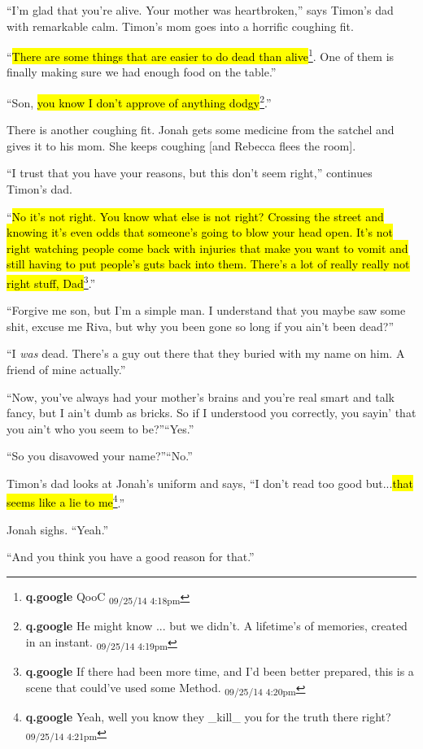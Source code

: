 ``I'm glad that you're alive.  Your mother was heartbroken,'' says Timon's dad with remarkable calm.  Timon's mom goes into a horrific coughing fit.

``\hl{There are some things that are easier to do dead than alive}\footnote{\textbf{q.google }QooC \textsubscript{09/25/14 4:18pm}}.  One of them is finally making sure we had enough food on the table.''

``Son, \hl{you know I don't approve of anything dodgy}\footnote{\textbf{q.google }He might know ... but we didn't.  A lifetime's of memories, created in an instant. \textsubscript{09/25/14 4:19pm}}.''

There is another coughing fit.  Jonah gets some medicine from the satchel and gives it to his mom.  She keeps coughing {[}and Rebecca flees the room{]}.

``I trust that you have your reasons, but this don't seem right,'' continues Timon's dad.

``\hl{No it's not right.  You know what else is not right?  Crossing the street and knowing it's even odds that someone's going to blow your head open.  It's not right watching people come back with injuries that make you want to vomit and still having to put people's guts back into them.  There's a lot of really really not right stuff, Dad}\footnote{\textbf{q.google }If there had been more time, and I'd been better prepared, this is a scene that could've used some Method. \textsubscript{09/25/14 4:20pm}}.''

``Forgive me son, but I'm a simple man.  I understand that you maybe saw some shit, excuse me Riva, but why you been gone so long if you ain't been dead?''

``I \textit{was }dead.  There's a guy out there that they buried with my name on him.  A friend of mine actually.''

``Now, you've always had your mother's brains and you're real smart and talk fancy, but I ain't dumb as bricks.  So if I understood you correctly, you sayin' that you ain't who you seem to be?''``Yes.''

``So you disavowed your name?''``No.''

Timon's dad looks at Jonah's uniform and says, ``I don't read too good but...\hl{that seems like a lie to me}\footnote{\textbf{q.google }Yeah, well you know they \_kill\_ you for the truth there right? \textsubscript{09/25/14 4:21pm}}.''

Jonah sighs.  ``Yeah.''

``And you think you have a good reason for that.''

